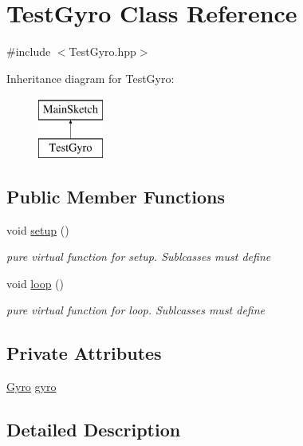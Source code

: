\hypertarget{classTestGyro}{\section{Test\-Gyro Class Reference}
\label{classTestGyro}
}


{\ttfamily \#include $<$Test\-Gyro.\-hpp$>$}

Inheritance diagram for Test\-Gyro\-:\begin{figure}[H]
\begin{center}
\leavevmode
\includegraphics[height=2.000000cm]{classTestGyro}
\end{center}
\end{figure}
\subsection*{Public Member Functions}
\begin{DoxyCompactItemize}
\item 
void \hyperlink{classTestGyro_a22db01127ec2059a00d2c47f07fa6302}{setup} ()
\begin{DoxyCompactList}\small\item\em pure virtual function for setup. Sublcasses must define \end{DoxyCompactList}\item 
void \hyperlink{classTestGyro_a7ae3922dac31681bd2adc7aaf34bf58e}{loop} ()
\begin{DoxyCompactList}\small\item\em pure virtual function for loop. Sublcasses must define \end{DoxyCompactList}\end{DoxyCompactItemize}
\subsection*{Private Attributes}
\begin{DoxyCompactItemize}
\item 
\hyperlink{classGyro}{Gyro} \hyperlink{classTestGyro_a3227ef60350305553a8cd0712aa807bb}{gyro}
\end{DoxyCompactItemize}


\subsection{Detailed Description}


